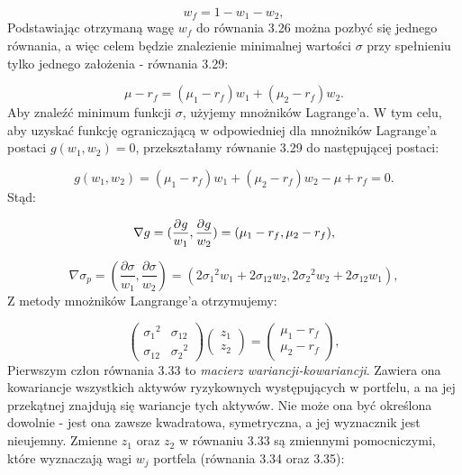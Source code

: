 \documentclass[magister]{dyplom}
\begin{document}
\begin{equation}
	w_f = 1 - w_1 - w_2,
\end{equation}
Podstawiając otrzymaną wagę $w_f$ do równania 3.26 można pozbyć się jednego równania, a więc celem będzie znalezienie minimalnej wartości $\sigma$ przy spełnieniu tylko jednego założenia - równania 3.29:

\begin{equation}
	\mu - r_f = (\mu_1 - r_f)w_1 + (\mu_2 - r_f)w_2.
\end{equation}
Aby znaleźć minimum funkcji $\sigma$, użyjemy mnożników Lagrange'a\cite{lagrange}. W tym celu, aby uzyskać funkcję ograniczającą w odpowiedniej dla mnożników Lagrange'a postaci $g(w_1, w_2) = 0$, przekształamy równanie 3.29 do następującej postaci:

\begin{equation}
g(w_1, w_2) = (\mu_1 - r_f)w_1 + (\mu_2 - r_f)w_2 - \mu + r_f = 0.
\end{equation}
Stąd:

\begin{equation}
	\nabla\\g = (\frac{\partial\\g}{w_1}, \frac{\partial\\g}{w_2}) = (\mu_1 - r_f, \mu_2 - r_f),
\end{equation}

\begin{equation}
	\nabla\sigma_p = (\frac{\partial\sigma}{w_1}, \frac{\partial\sigma}{w_2}) = (2{\sigma_1}^2w_1 + 2\sigma_{12}w_2, 2{\sigma_2}^2w_2 + 2\sigma_{12}w_1),
\end{equation}
Z metody mnożników Langrange'a otrzymujemy:

\begin{equation}
	\left( \begin{array}{cc}
		{\sigma_1}^2 & \sigma_{12}\\
		\sigma_{12} & {\sigma_2}^2
	\end{array} \right)
	\left( \begin{array}{c}
		z_1\\
		z_2
	\end{array} \right) =
	\left( \begin{array}{c}
		\mu_1 - r_f\\
		\mu_2 - r_f
	\end{array} \right),
\end{equation}
Pierwszym człon równania 3.33 to \textit{macierz wariancji-kowariancji}. Zawiera ona kowariancje wszystkich aktywów ryzykownych występujących w portfelu, a na jej przekątnej znajdują się wariancje tych aktywów. Nie może ona być określona dowolnie - jest ona zawsze kwadratowa, symetryczna, a jej wyznacznik jest nieujemny.
Zmienne $z_1$ oraz $z_2$ w równaniu 3.33 są zmiennymi pomocniczymi, które wyznaczają wagi $w_j$ portfela (równania 3.34 oraz 3.35):
\end{document}
